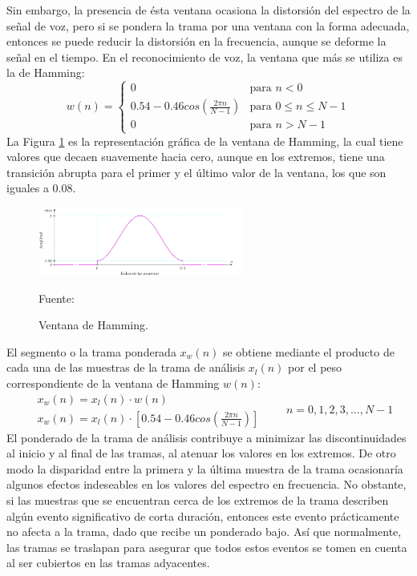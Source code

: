 \begin{enumerate}
\begin{enumerate}
Sin embargo, la presencia de ésta ventana ocasiona la distorsión del espectro de la señal de voz, pero si se pondera la trama por una ventana con la forma adecuada, entonces se puede reducir la distorsión en la frecuencia, aunque se deforme la señal en el tiempo. En el reconocimiento de voz, la ventana que más se utiliza es la de Hamming:
\begin{equation}
\label{eq:ecuacion36}
%
w(n) = 
\begin{cases}
0 & \text{para $n < 0$} \\ 
0.54 - 0.46cos(\frac{2\pi n}{N-1}) & \text{para $0 \leq  n \leq  N-1$} \\ 
0 & \text{para $n > N-1$} 
\end{cases}
%
\end{equation}
La Figura \ref{fig:figura2.35} es la representación gráfica de la ventana de Hamming, la cual tiene valores que decaen suavemente hacia cero, aunque en los extremos, tiene una transición abrupta para el primer y el último valor de la ventana, los que son iguales a 0.08.

\newpage
\begin{figure}[ht]
\begin{center}
\includegraphics[width=0.6\textwidth]{Imagenes/Cap2/image036}
\end{center}
\begin{center}
\vskip -0.5cm
\caption{\small{Ventana de Hamming.}}
\label{fig:figura2.35}
{\small{Fuente: \cite{perez}}}
\end{center}
\end{figure}
El segmento o la trama ponderada $x_{w}(n)$ se obtiene mediante el producto de cada una de las muestras de la trama de análisis $x_{l}(n)$ por el peso correspondiente de la ventana de Hamming $w(n)$:
\begin{equation}
\label{eq:ecuacion37}
\begin{aligned}
& x_{w}(n) = x_{l}(n) \cdot w(n) \\
& x_{w}(n) = x_{l}(n) \cdot \left [ 0.54 - 0.46cos\left ( \frac{2 \pi n}{N-1} \right ) \right ]
\end{aligned}
\qquad
n = 0,1,2,3,...,N-1
\end{equation}
\vskip 0.5cm
El ponderado de la trama de análisis contribuye a minimizar las discontinuidades al inicio y al final de las tramas, al atenuar los valores en los extremos. De otro modo la disparidad entre la primera y la última muestra de la trama ocasionaría algunos efectos indeseables en los valores del espectro en frecuencia. No obstante, si las muestras que se encuentran cerca de los extremos de la trama describen algún evento significativo de corta duración, entonces este evento prácticamente no afecta a la trama, dado que recibe un ponderado bajo. Así que normalmente, las tramas se traslapan para asegurar que todos estos eventos se tomen en cuenta al ser cubiertos en las tramas adyacentes.


\end{enumerate}
\end{enumerate}
